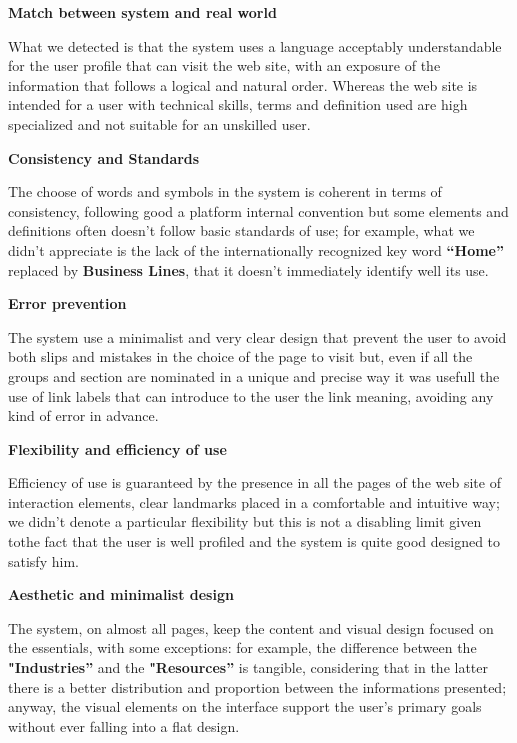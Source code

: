 \textbf{Match between system and real world}\par
What we detected is that the system uses a language acceptably understandable for the user profile that can visit the web site, with an exposure of the information that follows a logical and natural order. Whereas the web site is intended for a user with technical skills, terms and definition used are high specialized and not suitable for an unskilled user. 
\medskip

\textbf{Consistency and Standards}\par
The choose of words and symbols in the system is coherent in terms of consistency, following good a platform internal convention but some elements and definitions often doesn’t follow basic standards of use; for example, what we didn’t appreciate is the lack of the internationally recognized key word \textbf{“Home”} replaced by \textbf{Business Lines}, that it doesn’t immediately identify well its use. 
\medskip

\textbf{Error prevention}\par
The system use a minimalist and very clear design that prevent the user to avoid both slips and mistakes in the choice of the page to visit but, even if all the groups and section are nominated in a unique and precise way it was usefull the use of link labels that can introduce to the user the link meaning, avoiding any kind of error in advance. 
\medskip

\textbf{Flexibility and efficiency of use}\par
Efficiency of use is guaranteed by the presence in all the pages of the web site of interaction elements, clear landmarks placed in a comfortable and intuitive way; we didn’t denote a particular flexibility but this is not a disabling limit given tothe fact that the user is well profiled and the system is quite good designed to satisfy him. 
\medskip

\textbf{Aesthetic and minimalist design}\par
The system, on almost all pages, keep the content and visual design focused on the essentials, with some exceptions: for example, the difference between the \textbf{"Industries”} and the \textbf{"Resources”} is tangible, considering that in the latter there is a better distribution and proportion between the informations presented; anyway, the visual elements on the interface support the user’s primary goals without ever falling into a flat design. 